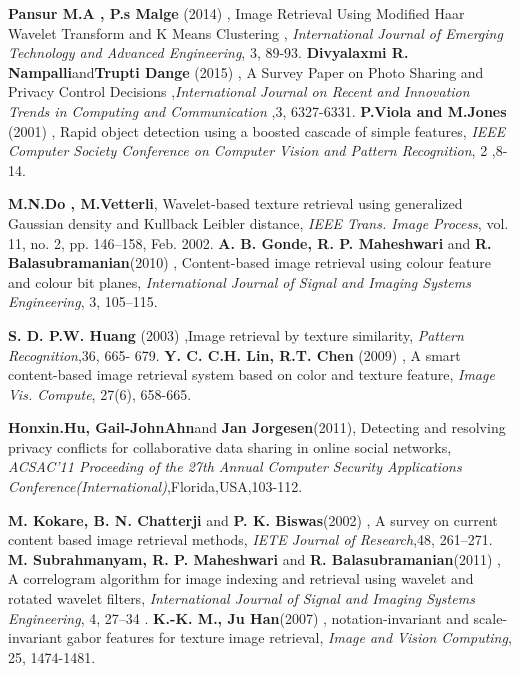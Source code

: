 \begin{thebibliography}{50}
\textbf{Pansur M.A , P.s Malge} (2014) , Image Retrieval Using Modified Haar Wavelet Transform and K Means Clustering , \textit{International Journal of Emerging Technology and Advanced Engineering}, 3, 89-93.
\textbf{Divyalaxmi R. Nampalli}and\textbf{Trupti Dange} (2015) , A Survey Paper on Photo Sharing and Privacy Control Decisions ,\textit{International Journal on Recent and Innovation Trends in Computing and Communication} ,3, 6327-6331.
\textbf{P.Viola and M.Jones} (2001) , Rapid object detection using a boosted cascade of simple features,\textit { IEEE Computer Society Conference on Computer Vision and Pattern Recognition}, 2 ,8-14.

\textbf{M.N.Do , M.Vetterli}, Wavelet-based texture retrieval using generalized Gaussian density and Kullback Leibler distance,\textit{ IEEE Trans. Image Process}, vol. 11, no. 2, pp. 146–158, Feb. 2002.
\textbf{A. B. Gonde, R. P. Maheshwari} and \textbf{ R. Balasubramanian}(2010) , Content-based image retrieval using colour feature and colour bit planes, \textit{International Journal of Signal and Imaging Systems Engineering}, 3, 105–115.

\textbf{ S. D. P.W. Huang} (2003) ,Image retrieval by texture similarity,  \textit {Pattern Recognition},36, 665- 679. 
\textbf{Y. C. C.H. Lin, R.T. Chen}  (2009) , A smart content-based image retrieval system based   on color and texture  feature,\textit{ Image Vis. Compute}, 27(6),  658-665.

\textbf{Honxin.Hu, Gail-JohnAhn}and\textbf{ Jan Jorgesen}(2011), Detecting and resolving privacy conflicts for collaborative data sharing in online social networks,\textit{ ACSAC’11 Proceeding of the 27th Annual  Computer Security Applications Conference(International)},Florida,USA,103-112.


\textbf{M. Kokare, B. N. Chatterji }and\textbf{ P. K. Biswas}(2002) ,  A survey on current content based image retrieval methods, \textit{IETE Journal of Research},48, 261–271.
\textbf{M. Subrahmanyam, R. P. Maheshwari} and\textbf{ R. Balasubramanian}(2011) , A correlogram algorithm for image indexing and retrieval using wavelet and rotated wavelet filters, \textit{International Journal of Signal and Imaging Systems Engineering},  4,  27–34 .
\textbf{K.-K. M., Ju Han}(2007) , notation-invariant and scale-invariant gabor features for texture       image retrieval, \textit{Image and Vision Computing}, 25, 1474-1481.


\end{thebibliography}
